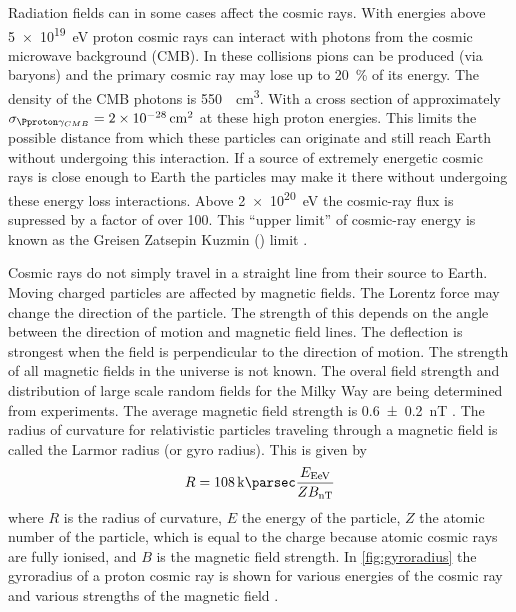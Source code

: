 Radiation fields can in some cases affect the cosmic rays. With energies above \SI{5e19}{\eV} proton cosmic rays can interact with photons from the cosmic microwave background (CMB). In these collisions pions can be produced (via \PDelta baryons) and the primary cosmic ray may lose up to \SI{20}{\percent} of its energy. The density of the CMB photons is \SI{550}{\per\centi\meter\cubed}. With a cross section of approximately $\sigma_{\Pproton \gamma_{CMB}} = \SI{2e-28}{\centi\meter\squared}$ at these high proton energies. This limits the possible distance from which these particles can originate and still reach Earth without undergoing this interaction. If a source of extremely energetic cosmic rays is close enough to Earth the particles may make it there without undergoing these energy loss interactions. Above \SI{2e20}{\eV} the cosmic-ray flux is supressed by a factor of over 100. This ``upper limit'' of cosmic-ray energy is known as the Greisen Zatsepin Kuzmin (\gzk) limit \cite{zatsepin1966gzk,greisen1966gzk}.

Cosmic rays do not simply travel in a straight line from their source to Earth. Moving charged particles are affected by magnetic fields. The Lorentz force may change the direction of the particle. The strength of this depends on the angle between the direction of motion and magnetic field lines. The deflection is strongest when the field is perpendicular to the direction of motion. The strength of all magnetic fields in the universe is not known. The overal field strength and distribution of large scale random fields for the Milky Way are being determined from experiments. The average magnetic field strength is \SI{0.6 \pm 0.2}{\nano\tesla} \cite{jansson2010magnetic}. The radius of curvature for relativistic particles traveling through a magnetic field is called the Larmor radius (or gyro radius). This is given by
%
\begin{equation}
    R = \SI{108}{\kilo\parsec} \frac{E_{\si{\exa\eV}}}{Z B_{\si{\nano\tesla}}}
\end{equation}
%
where $R$ is the radius of curvature, $E$ the energy of the particle, $Z$ the atomic number of the particle, which is equal to the charge because atomic cosmic rays are fully ionised, and $B$ is the magnetic field strength. In \cref{fig:gyroradius} the gyroradius of a proton cosmic ray is shown for various energies of the cosmic ray and various strengths of the magnetic field \cite{grigat2011anisotropy}.

